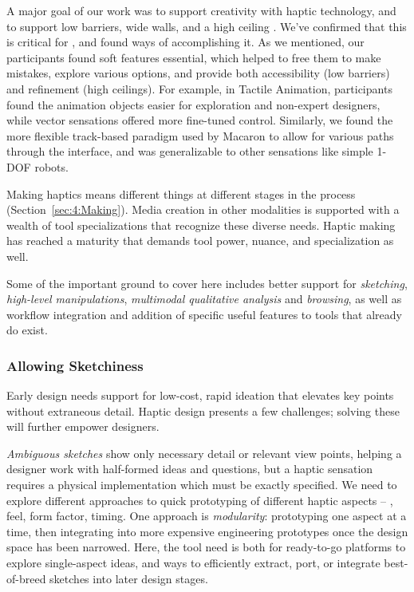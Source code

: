 A major goal of our work was to support creativity with haptic technology, and to support low barriers, wide walls, and a high ceiling \cite{Shneiderman2007,Resnick2008}.
We've confirmed that this is critical for \haxd, and found ways of accomplishing it.
As we mentioned, our participants found soft features essential, which helped to free them to make mistakes, explore various options, and provide both accessibility (low barriers) and refinement (high ceilings).
For example, in Tactile Animation, participants found the animation objects easier for exploration and non-expert designers, while vector sensations offered more fine-tuned control.
Similarly, we found the more flexible track-based paradigm used by Macaron to allow for various paths through the interface, and was generalizable to other sensations like simple 1-DOF robots.



Making haptics means different things at different stages in the process (Section~\ref{sec:4:Making}). 
Media creation in other modalities is supported with a wealth of tool specializations that recognize these diverse needs. Haptic making has reached a maturity that demands tool power, nuance, and specialization as well.

Some of the important ground to cover here includes better support for \textit{sketching}, \textit{high-level manipulations}, \textit{multimodal qualitative analysis} and \textit{browsing}, as well as workflow integration and addition of specific useful features to tools that already do exist.

%
%
\subsubsection{Allowing Sketchiness}
Early design needs support for low-cost, rapid ideation that elevates key points without extraneous detail. Haptic design presents a few challenges; solving these will further empower designers.

\textit{Ambiguous sketches} show only necessary detail or relevant view points, helping a designer work with half-formed ideas and questions, but a haptic sensation requires a physical implementation which must be exactly specified. 
%
We need to explore different approaches to quick prototyping of different haptic aspects -- \eg, feel, form factor, timing. One approach is \textit{modularity}: prototyping one aspect at a time, then integrating into more expensive engineering prototypes once the design space has been narrowed. Here, the tool need is both for ready-to-go platforms to explore single-aspect ideas, and ways to efficiently extract, port, or integrate best-of-breed sketches into later design stages.
    
